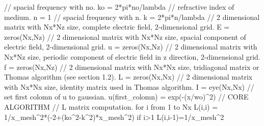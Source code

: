 \documentclass[a4paper]{article}
\begin{document}
{		\textcolor{OliveGreen}{// spacial frequency with no.}\newline
		ko = 2*pi*no/lambda\newline
		\textcolor{OliveGreen}{// refractive index of medium.}\newline
		n = 1\newline
		\textcolor{OliveGreen}{// spacial frequency with n.}\newline
		k = 2*pi*n/lambda\newline\newline
		\textcolor{OliveGreen}{// 2 dimensional matrix with Nx*Nz size, complete electric field, 2-dimensional grid.}\newline
		E = zeros(Nx,Nz)\newline
		\textcolor{OliveGreen}{// 2 dimensional matrix with Nx*Nz size, spacial component of electric field, 2-dimensional grid.}\newline
		u = zeros(Nx,Nz)\newline
		\textcolor{OliveGreen}{// 2 dimensional matrix with Nx*Nz size, periodic component of electric field in z direction, 2-dimensional grid.}\newline
		f = zeros(Nx,Nz)\newline
		\textcolor{OliveGreen}{// 2 dimensional matrix with Nx*Nx size, tridiagonal matrix or Thomas algorithm (see section 1.2).}\newline
		L = zeros(Nx,Nx)\newline
		\textcolor{OliveGreen}{// 2 dimensional matrix with Nx*Nx size, identity matrix used in Thomas algorithm.}\newline
		I = eye(Nx,Nx)\newline\newline
		\textcolor{OliveGreen}{// set first colomn of u to gaussian.}\newline
		u(first\_colomn) = exp(-(x/wo)\string^2)\newline\newline
		\textcolor{OliveGreen}{// CORE ALGORITHM}\newline\newline
		\textcolor{OliveGreen}{// L matrix computation.}\newline
		for i from 1 to Nx \newline
		\indent L(i,i) = 1/x\_mesh\string^2*(-2+(ko\string^2-k\string^2)*x\_mesh\string^2)\newline
		\indent if i>1\newline
		\indent\indent L(i,i-1)=1/x\_mesh\string^2\newline
}
\end{document}

